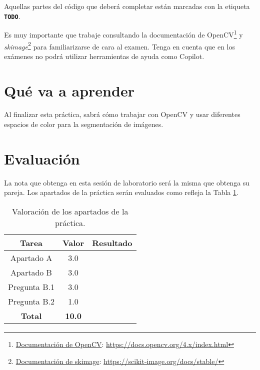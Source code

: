 Aquellas partes del código que deberá completar están marcadas con la etiqueta \textbf{\texttt{TODO}}.

Es muy importante que trabaje consultando la documentación de OpenCV\footnote{\href{https://docs.opencv.org/4.x/index.html}{Documentación de OpenCV}: \url{https://docs.opencv.org/4.x/index.html}} y \textit{skimage}\footnote{\href{https://scikit-image.org/docs/stable/}{Documentación de skimage}: \url{https://scikit-image.org/docs/stable/}} para familiarizarse de cara al examen. Tenga en cuenta que en los exámenes no podrá utilizar herramientas de ayuda como Copilot.

\section{Qué va a aprender}

Al finalizar esta práctica, sabrá cómo trabajar con OpenCV y usar diferentes espacios de color para la segmentación de imágenes.

\section{Evaluación}

La nota que obtenga en esta sesión de laboratorio será la misma que obtenga su pareja. Los apartados de la práctica serán evaluados como refleja la Tabla \ref{table:evaluacion}.

\begin{table}[h!]
    \centering
    \begin{tabular}{|c|c|c|}
    \hline
    \textbf{Tarea} & \textbf{Valor} & \textbf{Resultado} \\
    \hline
    Apartado A & 3.0 & \\
    \hline
    Apartado B & 3.0 & \\
    \hline
    Pregunta B.1 & 3.0 & \\
    \hline
    Pregunta B.2 & 1.0 & \\
    \hline
    \hline
    \textbf{Total} & \textbf{10.0} & \\
    \hline
    \end{tabular}
    \caption{Valoración de los apartados de la práctica.}
    \label{table:evaluacion}
\end{table}
